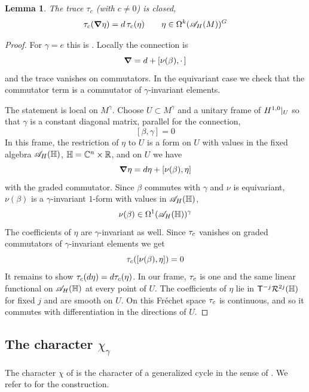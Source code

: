 \documentclass[11pt]{amsart}
\theoremstyle{plain}
\newtheorem{lemma}[theorem]{Lemma}
\theoremstyle{definition}
\theoremstyle{remark}
\begin{document}
\begin{lemma}\label{lem:Tr_gamma closed}
The trace $\tau_c$ (with $c\ne 0$) is closed,
\[ \tau_{c}(\boldsymbol{\nabla}\eta)=d\,\tau_{c}(\eta)\qquad \eta\in\Omega^k({\mathscr{A}}_H(M))^G\]
\end{lemma}
\begin{proof}
For $\gamma=e$ this is \cite[Section~5.7]{GvE20}. Locally the connection is
\[ \boldsymbol{\nabla}=d+[\nu(\beta),\cdot\,]\]
and the trace vanishes on commutators.
In the equivariant case we check that the commutator term is a commutator of $\gamma$-invariant elements.

The statement is local on $M^\gamma$.
Choose $U\subset M^\gamma$ and a unitary frame of $H^{1,0}|_U$  so that $\gamma$ is a constant diagonal matrix, parallel for the connection,
\[ [\beta,\gamma]=0\]
In this frame, the restriction of $\eta$ to $U$ is a form on $U$ with values in the fixed algebra ${\mathscr{A}}_H(\mathbb{H})$, $\mathbb{H}={\mathbb{C}}^n\times{\mathbb{R}}$, and on $U$ we have
\[\boldsymbol{\nabla}\eta=d\eta+[\nu(\beta),\eta]\]
with the graded commutator.
Since $\beta$ commutes with $\gamma$ and $\nu$ is equivariant, $\nu(\beta)$ is a $\gamma$-invariant $1$-form with values in ${\mathscr{A}}_H(\mathbb{H})$,
\[ \nu(\beta)\in \Omega^1({\mathscr{A}}_H(\mathbb{H}))^\gamma\]
The coefficients of $\eta$ are $\gamma$-invariant as well.
Since  $\tau_{c}$ vanishes on graded commutators of $\gamma$-invariant elements we get 
\[\tau_{c}([\nu(\beta),\eta])=0\]
It remains to show $\tau_{c}(d\eta)=d\tau_{c}(\eta)$.
In our frame, $\tau_{c}$ is one and the same linear functional on ${\mathscr{A}}_H(\mathbb{H})$ at every point of $U$.
The coefficients of $\eta$ lie in  $\mathsf{T}^{-j}\mathcal{R}^{2j}(\mathbb{H})$ for fixed $j$ and are smooth on $U$.
On this Fr\'echet space $\tau_{c}$ is continuous, and so it commutes with differentiation in the directions of $U$.


\end{proof}


\subsection{The character $\chi_\gamma$}\label{sec:chi_gamma}

The character $\chi$ of \cite{GvE20} is the character of a generalized cycle in the sense of \cite{gor1,gor2}.
We refer to \cite[Sections~6.2 and 6.3]{GvE20} for the construction.
\end{document}
